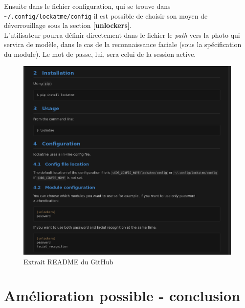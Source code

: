 \documentclass[french]{report}
\begin{document}
Ensuite dans le fichier configuration, qui se trouve dans \verb|~/.config/lockatme/config|
il est possible de choisir son moyen de déverrouillage sous la section \textbf{[unlockers]}.
\\
L'utilisateur pourra définir directement dans le fichier le \emph{path} vers la photo qui servira
de modèle, dans le cas de la reconnaissance faciale (sous la spécification du module). Le mot de passe, lui, sera celui de
la session active.

\begin{figure}[h]\label{fig:readme}
  \includegraphics[width=\linewidth]{readme}
  \caption{Extrait README du GitHub}
  \label{fig:readme}
\end{figure}


\chapter{Amélioration possible - conclusion}

\newpage
\end{document}
